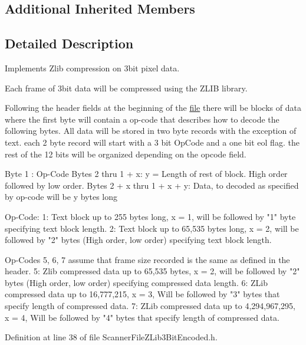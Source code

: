 \subsection*{Additional Inherited Members}


\subsection{Detailed Description}
Implements Zlib compression on 3bit pixel data. 

Each frame of 3bit data will be compressed using the Z\+L\+IB library. 
\begin{DoxyCode}
Following the header fields at the beginning of the \hyperlink{class_k_k_l_s_c_1_1_scanner_file_a26db15f7823ce67b1621da17468ec807}{file} there will be blocks of data
where the first byte will contain a op-code that describes how to decode the following
bytes.  
All data will be stored in two byte records with the exception of text.
each 2 byte record will start with a 3 bit OpCode and a one bit eol flag.
the rest of the 12 bits will be organized depending on the opcode field.

Byte  1           : Op-Code
Bytes 2      thru 1 + x:      y = Length of rest of block.  High order followed by low order.
Bytes 2 + x  thru 1 + x + y:  Data, to decoded as specified by op-code will be y bytes \textcolor{keywordtype}{long}

Op-Code:
1:  Text block up to 255 bytes long,          x = 1, will be followed by \textcolor{stringliteral}{"1"} byte specifying text block 
      length.
2:  Text block up to 65,535 bytes long,       x = 2, will be followed by \textcolor{stringliteral}{"2"} bytes (High order, low order) 
      specifying
    text block length.

Op-Codes 5, 6, 7 assume that frame size recorded is the same as defined in the header.
5:  Zlib compressed data up to 65,535 bytes,  x = 2, will be followed by \textcolor{stringliteral}{"2"} bytes (High order, low order) 
      specifying 
    compressed data length.
6:  ZLib compressed data up to 16,777,215,    x = 3, Will be followed by \textcolor{stringliteral}{"3"} bytes that specify length of 
      compressed data.
7:  ZLib compressed data up to 4,294,967,295, x = 4, Will be followed by \textcolor{stringliteral}{"4"} bytes that specify length of 
      compressed data.
\end{DoxyCode}
 

Definition at line 38 of file Scanner\+File\+Z\+Lib3\+Bit\+Encoded.\+h.



